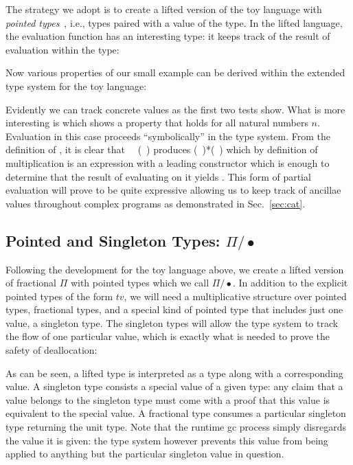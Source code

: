 \documentclass[sigplan,10pt,review,anonymous]{acmart}
\newcommand{\Afun}[1]{\AgdaFunction{#1}}
\newcommand{\Acon}[1]{\AgdaInductiveConstructor{#1}}
\newcommand{\Avar}[1]{\AgdaBound{#1}}
\begin{document}
The strategy we adopt is to create a lifted version of the toy
language with \emph{pointed types}~\cite{hottbook}, i.e., types paired with
a value of the type. In the lifted language, the evaluation
function has an interesting type: it keeps track of the result of
evaluation within the type:

\Jexamplecont{}

Now various properties of our small example
 can be derived within
the extended type system for the toy language:

\Jexampletest{}

Evidently we can track concrete values as the first two tests
show. What is more interesting is  which shows a
property that holds for all natural numbers $n$. Evaluation in this
case proceeds ``symbolically'' in the type system. From the definition
of \Afun{eval}, it is clear that
\Afun{eval}~\Acon{square}~(\Acon{suc}~\Avar{n}) produces
(\Acon{suc}~\Avar{n})*(\Acon{suc}~\Avar{n}) which by definition of
multiplication is an expression with a leading \Acon{suc} constructor
which is enough to determine that the result of evaluating
\Acon{isZero} on it yields \Acon{false}. This form of partial
evaluation will prove to be quite expressive allowing us to keep track
of ancillae values throughout complex programs as demonstrated in
Sec.~\ref{sec:cat}.

\subsection{Pointed and Singleton Types: $\Pi/\bullet$}

Following the development for the toy language above, we create a
lifted version of fractional $\Pi$ with pointed types which we call
$\Pi/\bullet$. In addition to the explicit pointed types of the form
$t$\Acon{\#}$v$, we will need a multiplicative structure over pointed
types, fractional types, and a special kind of pointed type that
includes just one value, a singleton type. The singleton types will
allow the type system to track the flow of one particular value, which
is exactly what is needed to prove the safety of deallocation:

\PIPFUdef{}

As can be seen, a lifted type is interpreted as a type along with a
corresponding value. A singleton type consists a special value of a
given type: any claim that a value belongs to the singleton type must
come with a proof that this value is equivalent to the special
value. A fractional type consumes a particular singleton type
returning the unit type. Note that the runtime gc process simply
disregards the value it is given: the type system however prevents
this value from being applied to anything but the particular singleton
value in question.
\end{document}

